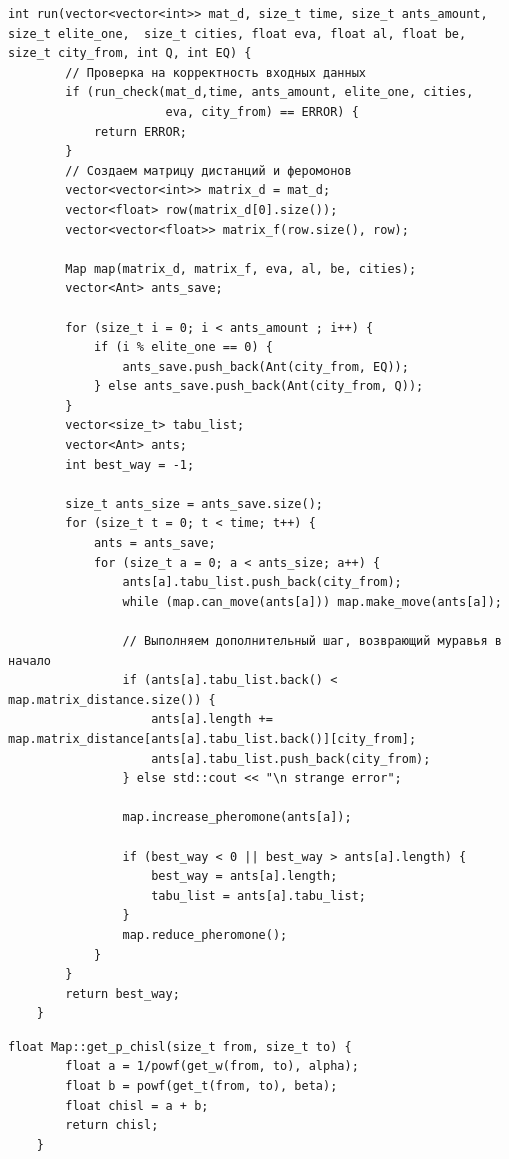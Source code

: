 \documentclass[a4paper, 14pt]{article}
\begin{document}
	 \begin{lstlisting}[label=code:run,caption=Функция run - получить кратчайший путь]
    int run(vector<vector<int>> mat_d, size_t time, size_t ants_amount, size_t elite_one,  size_t cities, float eva, float al, float be,  size_t city_from, int Q, int EQ) {
        // Проверка на корректность входных данных
        if (run_check(mat_d,time, ants_amount, elite_one, cities,
                      eva, city_from) == ERROR) {
            return ERROR;
        }
        // Создаем матрицу дистанций и феромонов
        vector<vector<int>> matrix_d = mat_d;
        vector<float> row(matrix_d[0].size());
        vector<vector<float>> matrix_f(row.size(), row);
    
        Map map(matrix_d, matrix_f, eva, al, be, cities);
        vector<Ant> ants_save;
        
        for (size_t i = 0; i < ants_amount ; i++) {
            if (i % elite_one == 0) {
                ants_save.push_back(Ant(city_from, EQ));
            } else ants_save.push_back(Ant(city_from, Q));
        }
        vector<size_t> tabu_list;
        vector<Ant> ants;
        int best_way = -1;
    
        size_t ants_size = ants_save.size();
        for (size_t t = 0; t < time; t++) {
            ants = ants_save;
            for (size_t a = 0; a < ants_size; a++) {
                ants[a].tabu_list.push_back(city_from);
                while (map.can_move(ants[a])) map.make_move(ants[a]);
                
                // Выполняем дополнительный шаг, возврающий муравья в начало
                if (ants[a].tabu_list.back() < map.matrix_distance.size()) {
                    ants[a].length += map.matrix_distance[ants[a].tabu_list.back()][city_from];
                    ants[a].tabu_list.push_back(city_from);
                } else std::cout << "\n strange error";
                
                map.increase_pheromone(ants[a]);
    
                if (best_way < 0 || best_way > ants[a].length) {
                    best_way = ants[a].length;
                    tabu_list = ants[a].tabu_list;
                }
                map.reduce_pheromone();
            }
        }
        return best_way;
    }
	\end{lstlisting}
	
	\begin{lstlisting}[label=code:get_p_chisl,caption=Функция get\_p\_chisl - получить числитель формулы \ref{form:way}]
    float Map::get_p_chisl(size_t from, size_t to) {
        float a = 1/powf(get_w(from, to), alpha);
        float b = powf(get_t(from, to), beta);
        float chisl = a + b;
        return chisl;
    }
	\end{lstlisting}
	
\end{document}
